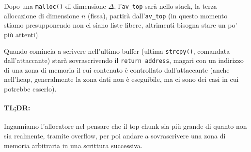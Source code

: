 Dopo una \texttt{malloc()} di dimensione $\Delta$, l'\texttt{av\_top} sarà nello stack, la terza allocazione di dimensione $n$ (fissa), partirà dall'\texttt{av\_top} (in questo momento stiamo presupponendo non ci siano liste libere, altrimenti bisogna stare un po' più attenti).

Quando comincia a scrivere nell'ultimo buffer (ultima \texttt{strcpy()}, comandata dall'attaccante) starà sovrascrivendo il \texttt{return address}, magari con un indirizzo di una zona di memoria il cui contenuto è controllato dall'attaccante (anche nell'heap, generalmente la zona dati non è eseguibile, ma ci sono dei casi in cui potrebbe esserlo).

\paragraph{TL;DR:} Inganniamo l'allocatore nel pensare che il top chunk sia più grande di quanto non sia realmente, tramite overflow, per poi andare a sovrascrivere una zona di memoria arbitraria in una scrittura successiva.
